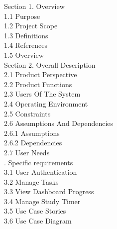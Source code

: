 \documentclass[12pt]{article}
\begin{document}
\noindent Section 1. Overview\\[0.3cm]
\hspace*{1cm}1.1 Purpose\\[0.3cm]
\hspace*{1cm}1.2 Project Scope\\[0.3cm]
\hspace*{1cm}1.3 Definitions\\[0.3cm]
\hspace*{1cm}1.4 References\\[0.3cm]
\hspace*{1cm}1.5 Overview\\[0.3cm]
\noindent Section 2. Overall Description\\[0.3cm]
\hspace*{1cm}2.1 Product Perspective\\[0.3cm]
\hspace*{1cm}2.2 Product Functions\\[0.3cm]
\hspace*{1cm}2.3 Users Of The System\\[0.3cm]
\hspace*{1cm}2.4 Operating Environment\\[0.3cm]
\hspace*{1cm}2.5 Constraints\\[0.3cm]
\hspace*{1cm}2.6 Assumptions And Dependencies\\[0.3cm]
\hspace*{1.5cm}2.6.1 Assumptions\\[0.3cm]
\hspace*{1.5cm}2.6.2 Dependencies\\[0.3cm]
\hspace*{1cm}2.7 User Needs\\[0.3cm]
. Specific requirements\\[0.3cm]
\hspace*{1cm}3.1 User Authentication\\[0.3cm]
\hspace*{1cm}3.2 Manage Tasks\\[0.3cm]
\hspace*{1cm}3.3 View Dashboard Progress\\[0.3cm]
\hspace*{1cm}3.4 Manage Study Timer\\[0.3cm]
\hspace*{1cm}3.5 Use Case Stories\\[0.3cm]
\hspace*{1cm}3.6 Use Case Diagram\\[0.3cm]
\end{document}
